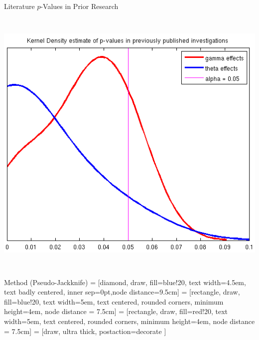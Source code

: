 \documentclass[final]{beamer}
\begin{document}
\begin{frame}{}
\begin{textblock}{45}
\begin{block}{Literature \hfill $p$-Values in Prior Research}
\begin{columns}
\tiny


\includegraphics[height=12.5cm]{kspcurve.png}
\end{columns}
\end{block}

\begin{block}{Method (Pseudo-Jackknife)}
\small
 = [diamond, draw, fill=blue!20, 
    text width=4.5em, text badly centered, inner sep=0pt,node distance=9.5cm]
 = [rectangle, draw, fill=blue!20, 
    text width=5em, text centered, rounded corners, minimum height=4em, node distance = 7.5cm]
 = [rectangle, draw, fill=red!20, 
    text width=5em, text centered, rounded corners, minimum height=4em, node distance = 7.5cm]
 = [draw, ultra thick, postaction={decorate}
									   ]
    

\end{block}
\end{textblock}
\end{frame}
\end{document}
